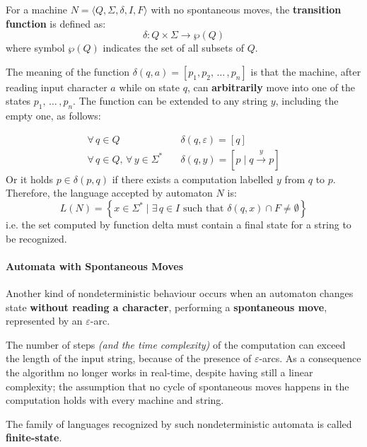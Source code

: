\documentclass[english]{article}
\begin{document}
\begin{definition}
  \label{def:transition-function}
  For a machine \(N = \langle Q, \Sigma, \delta, I, F \rangle\) with no spontaneous moves, the \textbf{transition function} is defined as:
  \[ \delta : Q \times \Sigma \rightarrow \wp(Q) \]
  where symbol \(\wp(Q)\) indicates the set of all subsets of \(Q\).
\end{definition}

The meaning of the function \(\delta(q, a) = \left[ p_1, p_2, \,\ldots\, , p_n \right]\) is that the machine, after reading input character \(a\) while on state \(q\), can \textbf{arbitrarily} move into one of the states \(p_1, \,\ldots\, , p_n\).
The function can be extended to any string \(y\), including the empty one, as follows:

\begin{align*}
  \forall \, q \in Q \quad                                  & \delta(q, \varepsilon) = \left[ q \right]                \\
  \forall \, q \in Q, \, \forall \, y \in \Sigma^\ast \quad & \delta(q, y) = \left[ p \mid q \xrightarrow{y} p \right]
\end{align*}
Or it holds \(p \in \delta(p, q)\) if there exists a computation labelled \(y\) from \(q\) to \(p\).
Therefore, the language accepted by automaton \(N\) is:
\[ L(N) = \left\{ x \in \Sigma^\ast \mid \exists \, q \in I \text{ such that } \delta(q, x) \cap F \neq \emptyset \right\} \]
i.e. the set computed by function delta must contain a final state for a string to be recognized.

\paragraph{Automata with Spontaneous Moves}

Another kind of nondeterministic behaviour occurs when an automaton changes state \textbf{without reading a character}, performing a \textbf{spontaneous move}, represented by an \(\varepsilon\)-arc.

The number of steps \textit{(and the time complexity)} of the computation can exceed the length of the input string, because of the presence of \(\varepsilon\)-arcs.
As a consequence the algorithm no longer works in real-time, despite having still a linear complexity;
the assumption that no cycle of spontaneous moves happens in the computation holds with every machine and string.

The family of languages recognized by such nondeterministic automata is called \textbf{finite-state}.
\end{document}
